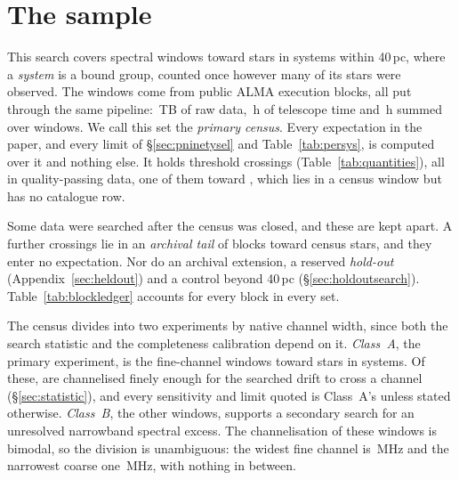 \section{The sample}
\label{sec:sample}

This search covers \NWindows{} spectral windows toward \NStars{} stars in
\NSystems{} systems within 40\,pc, where a \emph{system} is a bound group,
counted once however many of its stars were observed. The windows come from
\NEB{} public ALMA execution blocks, all put through the same pipeline:
\TotalDataTB\,TB of raw data, \StTelHours\,h of telescope time and
\LdgCensusHours\,h summed over windows. We call this set the \emph{primary
census}. Every expectation in the paper, and every limit of
\S\ref{sec:pninetysel} and Table~\ref{tab:persys}, is computed over it and
nothing else. It holds \CsNCross{} threshold crossings
(Table~\ref{tab:quantities}), all in quality-passing data, one of them toward
\CtUncatStar, which lies in a census window but has no catalogue row.

Some data were searched after the census was closed, and these are kept
apart. A further \CeNTailCross{} crossings lie in an \emph{archival tail} of
\LdgExtTail{} blocks toward \LdgTailStars{} census stars, and they enter no
expectation. Nor do an archival extension, a reserved \emph{hold-out}
(Appendix~\ref{sec:heldout}) and a control beyond 40\,pc
(\S\ref{sec:holdoutsearch}). Table~\ref{tab:blockledger} accounts for every
block in every set.

The census divides into two experiments by native channel width, since both
the search statistic and the completeness calibration depend on it.
\emph{Class~A}, the primary experiment, is the \NWinA{} fine-channel windows
toward \LdgClassAStars{} stars in \NSysClassA{} systems. Of these,
\EtaDriftAOk{} are channelised finely enough for the searched drift to cross a
channel (\S\ref{sec:statistic}), and every sensitivity and limit quoted is
Class~A's unless stated otherwise. \emph{Class~B}, the other \NWinB{}
windows, supports a secondary search for an unresolved narrowband spectral
excess. The channelisation of these windows is bimodal, so the division is
unambiguous: the widest fine channel is \ScChanFineMaxMHz\,MHz and the
narrowest coarse one \ScChanCoarseMinMHz\,MHz, with nothing in between.

